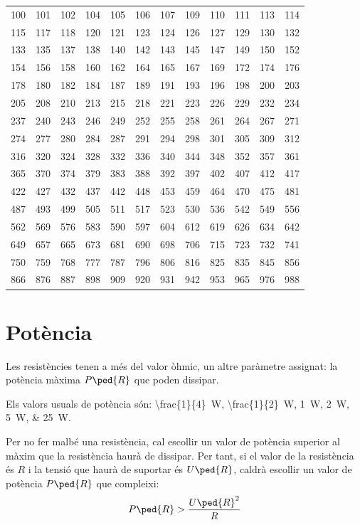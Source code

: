 \vspace{3mm}
\begin{center}
   \begin{tabular}{cccccccccccc}
   \toprule[1pt]
   100 & 101 & 102 & 104 & 105 & 106 & 107 & 109 & 110 & 111 & 113 & 114 \\
   115 & 117 & 118 & 120 & 121 & 123 & 124 & 126 & 127 & 129 & 130 & 132 \\
   133 & 135 & 137 & 138 & 140 & 142 & 143 & 145 & 147 & 149 & 150 & 152 \\
   154 & 156 & 158 & 160 & 162 & 164 & 165 & 167 & 169 & 172 & 174 & 176 \\
   178 & 180 & 182 & 184 & 187 & 189 & 191 & 193 & 196 & 198 & 200 & 203 \\
   205 & 208 & 210 & 213 & 215 & 218 & 221 & 223 & 226 & 229 & 232 & 234 \\
   237 & 240 & 243 & 246 & 249 & 252 & 255 & 258 & 261 & 264 & 267 & 271 \\
   274 & 277 & 280 & 284 & 287 & 291 & 294 & 298 & 301 & 305 & 309 & 312 \\
   316 & 320 & 324 & 328 & 332 & 336 & 340 & 344 & 348 & 352 & 357 & 361 \\
   365 & 370 & 374 & 379 & 383 & 388 & 392 & 397 & 402 & 407 & 412 & 417 \\
   422 & 427 & 432 & 437 & 442 & 448 & 453 & 459 & 464 & 470 & 475 & 481 \\
   487 & 493 & 499 & 505 & 511 & 517 & 523 & 530 & 536 & 542 & 549 & 556 \\
   562 & 569 & 576 & 583 & 590 & 597 & 604 & 612 & 619 & 626 & 634 & 642 \\
   649 & 657 & 665 & 673 & 681 & 690 & 698 & 706 & 715 & 723 & 732 & 741 \\
   750 & 759 & 768 & 777 & 787 & 796 & 806 & 816 & 825 & 835 & 845 & 856 \\
   866 & 876 & 887 & 898 & 909 & 920 & 931 & 942 & 953 & 965 & 976 & 988 \\
   \bottomrule[1pt]
   \end{tabular}
\end{center}


\section{Potència} \label{sec:resist-pot}

Les resistències tenen a més del valor òhmic, un altre paràmetre assignat: la potència màxima $P\ped{R}$ que poden dissipar.

Els valors usuals de potència són: \qtylist[parse-numbers = false]{\frac{1}{4}; \frac{1}{2}; 1; 2; 5; 25}{W}.

Per no fer malbé una resistència, cal escollir un valor de potència superior al màxim que la resistència haurà de dissipar. Per tant, si el valor de la resistència és $R$ i la tensió  que haurà de suportar és $U\ped{R}$, caldrà escollir un valor de potència $P\ped{R}$ que compleixi:
\begin{equation}
  P\ped{R} > \frac{U\ped{R}^2}{R}
\end{equation}

